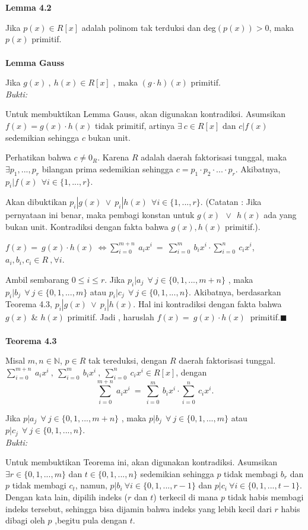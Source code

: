 	\\
	\\
	\textbf{Lemma 4.2}
\par 	Jika $p(x)\in R[x]$ adalah polinom tak terduksi dan deg$(p(x)) > 0$, maka $p(x)$ primitif.
	\\
	\\
	\textbf{Lemma Gauss}
\par 	Jika $g(x)~,~h(x)\in R[x]$ , maka $(g\cdot h)(x)$ primitif.
	\\
	\textit{Bukti:}
\par 	Untuk membuktikan Lemma Gauss, akan digunakan kontradiksi. Asumsikan $f(x) = g(x)\cdot h(x)$ tidak primitif, artinya $ \exists ~c \in R[x]$ dan $c | f(x)$ sedemikian sehingga $c$ bukan unit.
\par 	Perhatikan bahwa $c \ne 0_R$. Karena $R$ adalah daerah faktorisasi tunggal, maka $\exists p_1,...,p_r$ bilangan prima sedemikian sehingga $c = p_1\cdot p_2 \cdot ...\cdot p_r$. Akibatnya, $p_i|f(x)~~\forall i \in \{1,...,r\}$.
\par 	Akan dibuktikan $p_i|g(x)~\vee~ p_i|h(x)~~\forall i \in \{1,...,r\}$. (Catatan : Jika pernyataan ini benar, maka pembagi konstan untuk $g(x)~~\vee~~h(x)$ ada yang bukan unit. Kontradiksi dengan fakta bahwa $g(x),h(x)$ primitif.). 
\par 	$f(x) = ~g(x) \cdot h(x)~ \iff \sum^{m+n}_{i=0} \ a_ix^i~=~\sum^{m}_{i=0} \ b_ix^i \cdot \sum^{n}_{i=0} \ c_ix^i$, $a_i,b_i,c_i\in R~,\forall i$.
\par 	Ambil sembarang $0\le i \le r$. Jika $p_i |a_j~~\forall~j\in \{0,1,...,m+n\}$ , maka $p_i |b_j~~\forall~j\in\{0,1,...,m\}$ atau $p_i |c_j~~\forall~j\in \{0,1,...,n\}$. Akibatnya, berdasarkan Teorema 4.3, $p_i|g(x)~\vee~ p_i|h(x)$. Hal ini kontradiksi dengan fakta bahwa $g(x)$ \& $h(x)$ primitif. Jadi , haruslah $f(x) = ~g(x) \cdot h(x)~$ primitif.$\blacksquare$
	\\
	\\
	\textbf{Teorema 4.3}
\par 	Misal $m,n \in \mathbb{N}$, $p \in R$ tak tereduksi, dengan $R$ daerah faktorisasi tunggal. $\sum^{m+n}_{i=0} \ a_ix^i~,~\sum^{m}_{i=0} \ b_ix^i~,~ \sum^{n}_{i=0} \ c_ix^i \in R[x]$, dengan $$\sum^{m+n}_{i=0} \ a_ix^i~=~\sum^{m}_{i=0} \ b_ix^i \cdot \sum^{n}_{i=0} \ c_ix^i.$$
\par 	Jika $p |a_j~~\forall~j\in \{0,1,...,m+n\}$ , maka $p |b_j~~\forall~j\in\{0,1,...,m\}$ atau $p |c_j~~\forall~j\in \{0,1,...,n\}$.
	\\
	\textit{Bukti:}
\par 	Untuk membuktikan Teorema ini, akan digunakan kontradiksi. Asumsikan $\exists r\in \{0,1,...,m\}$ dan $t \in \{0,1,...,n\}$ sedemikian sehingga $p$ tidak membagi $b_r$ dan $p$ tidak membagi $c_t$, namun, $p|b_i~\forall i\in \{0,1,...,r-1\}$ dan $p|c_i~\forall i\in 			\{0,1,...,t-1\}$. Dengan kata lain, dipilih indeks ($r$ dan $t$) terkecil di mana $p$ tidak habis membagi indeks tersebut, sehingga bisa dijamin bahwa indeks yang lebih kecil dari $r$ habis dibagi oleh $p$ ,begitu pula dengan $t$. 
